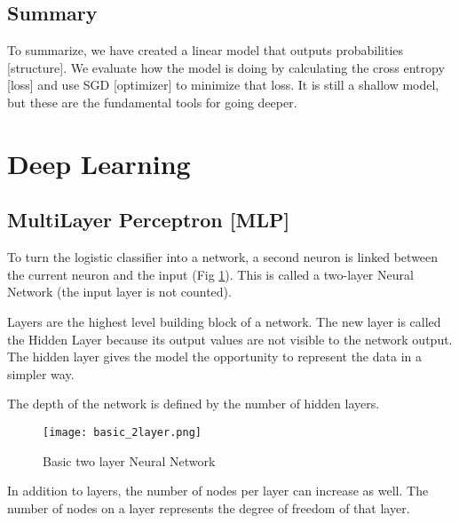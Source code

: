 \subsection{Summary}
To summarize, we have created a linear model that outputs probabilities [structure].  We evaluate how the model is doing by calculating the cross entropy [loss] and use SGD [optimizer] to minimize that loss.  It is still a shallow model, but these are the fundamental tools for going deeper.   
%
%
%

\section{Deep Learning}
\subsection{MultiLayer Perceptron [MLP]}
To turn the logistic classifier into a network, a second neuron is linked between the current neuron and the input (Fig \ref{fig:basic2L}).  This is called a two-layer Neural Network (the input layer is not counted).   

Layers are the highest level building block of a network.  The new layer is called the Hidden Layer because its output values are not visible to the network output.  The hidden layer gives the model the opportunity to represent the data in a simpler way.

The depth of the network is defined by the number of hidden layers. 

\begin{figure}[!h]
 \begin{center}
 \texttt{[image: basic\_2layer.png]}
 \caption{Basic two layer Neural Network}
 \label{fig:basic2L}
 \end{center}
 \end{figure}
In addition to layers, the number of nodes per layer can increase as well.  The number of nodes on a layer represents the degree of freedom of that layer.  

